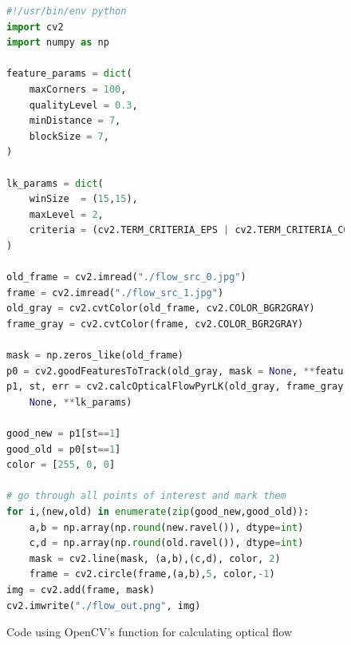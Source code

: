 \documentclass[a4paper, titlepage,12pt]{article}
\begin{document}
\begin{figure}
	\begin{center}
		\begin{lstlisting}[language=Python]
#!/usr/bin/env python
import cv2
import numpy as np

feature_params = dict(
    maxCorners = 100,
    qualityLevel = 0.3,
    minDistance = 7,
    blockSize = 7,
)

lk_params = dict(
    winSize  = (15,15),
    maxLevel = 2,
    criteria = (cv2.TERM_CRITERIA_EPS | cv2.TERM_CRITERIA_COUNT, 10, 0.03)
)

old_frame = cv2.imread("./flow_src_0.jpg")
frame = cv2.imread("./flow_src_1.jpg")
old_gray = cv2.cvtColor(old_frame, cv2.COLOR_BGR2GRAY)
frame_gray = cv2.cvtColor(frame, cv2.COLOR_BGR2GRAY)

mask = np.zeros_like(old_frame)
p0 = cv2.goodFeaturesToTrack(old_gray, mask = None, **feature_params)
p1, st, err = cv2.calcOpticalFlowPyrLK(old_gray, frame_gray, p0, 
	None, **lk_params)

good_new = p1[st==1]
good_old = p0[st==1]
color = [255, 0, 0]

# go through all points of interest and mark them
for i,(new,old) in enumerate(zip(good_new,good_old)):
    a,b = np.array(np.round(new.ravel()), dtype=int)
    c,d = np.array(np.round(old.ravel()), dtype=int)
    mask = cv2.line(mask, (a,b),(c,d), color, 2)
    frame = cv2.circle(frame,(a,b),5, color,-1)
img = cv2.add(frame, mask)
cv2.imwrite("./flow_out.png", img)
		\end{lstlisting}
		\caption{Code using OpenCV's function for calculating optical flow}
	\end{center}
\end{figure}
\end{document}
